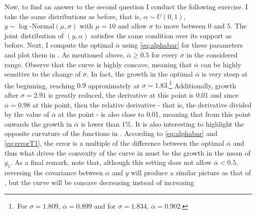 \documentclass[english, a4paper, 12pt]{article}
\begin{document}
Now, to find an answer to the second question I conduct the following exercise. I take the same distributions as before, that is, $\alpha \sim U(0,1)$, $y \sim \log\text{-Normal}(\mu, \sigma)$ with $\mu = 10$ and allow $\sigma$ to move between 0 and 5. The joint distribution of $(y,\alpha)$ satisfies the same condition over its support as before. Next, I compute the optimal $\overline{\alpha}$ using \eqref{eq:alphabar} for these parameters and plot them in . As mentioned above, $\overline{\alpha} \geq 0.5$ for every $\sigma$ in the considered range. Observe that the curve is highly concave, meaning that $\overline{\alpha}$ can be highly sensitive to the change of $\sigma$. In fact, the growth in the optimal $\overline{\alpha}$ is very steep at the beginning, reaching $0.9$ approximately at $\sigma = 1.83$.\footnote{\,For $\sigma = 1.809$, $\overline{\alpha} = 0.899$ and for $\sigma = 1.834$, $\overline{\alpha} = 0.902$.} Additionally, growth after $\sigma = 2.91$ is greatly reduced, the derivative at this point is 0.01 and since $\overline{\alpha} = 0.98$ at this point, then the relative derivative - that is, the derivative divided by the value of $\overline{\alpha}$ at the point - is also close to 0.01, meaning that from this point onwards the growth in $\overline{\alpha}$ is lower than 1\%.  It is also interesting to highlight the opposite curvature of the functions in . According to \eqref{eq:alphabar} and \eqref{eq:errorT1}, the error is a multiple of the difference between the optimal $\overline{\alpha}$ and thus what drives the convexity of the curve in  must be the growth in the mean of $y_{1}$. As a final remark, note that, although this setting does not allow $\overline{\alpha} < 0.5$, reversing the covariance between $\alpha$ and $y$ will produce a similar picture as that of , but the curve will be concave decreasing instead of increasing 
\end{document}
